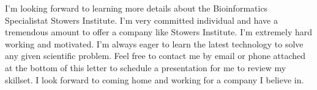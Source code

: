 \documentclass[11pt,a4paper,sans]{moderncv}        %
\newcommand{\Position}{Bioinformatics Specialist}
\newcommand{\Company}{Stowers Institute}
\begin{document}
I'm looking forward to learning more details about the \Position at \Company. I'm very committed individual and have a tremendous amount to offer a company like \Company. I'm extremely hard working and motivated. I'm always eager to learn the latest technology to solve any given scientific problem. Feel free to contact me by email or phone attached at the bottom of this letter to schedule a presentation for me to review my skillset. I look forward to coming home and working for a company I believe in. 

\makeletterclosing
\end{document}
